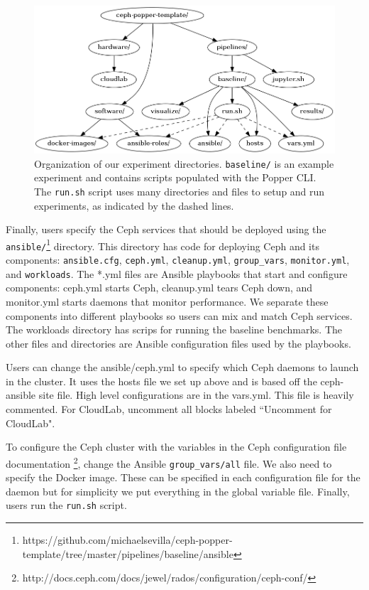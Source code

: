 \begin{figure}[tb] 
  \centering
  \includegraphics[width=1\linewidth]{./figures/expdir.png}
  \caption{Organization of our experiment directories. \texttt{baseline/} is an
example experiment and contains scripts populated with the Popper CLI. The
\texttt{run.sh} script uses many directories and files to setup and run
experiments, as indicated by the dashed lines.}
  \label{fig:expdir}
\end{figure}



Finally, users specify the Ceph services that should be deployed using the
\texttt{ansible/}\footnote{https://github.com/michaelsevilla/ceph-popper-template/tree/master/pipelines/baseline/ansible}
directory. This directory has code for deploying Ceph and its components:
\texttt{ansible.cfg}, \texttt{ceph.yml}, \texttt{cleanup.yml},
\texttt{group\_vars}, \texttt{monitor.yml}, and \texttt{workloads}. The *.yml
files are Ansible playbooks that start and configure components: ceph.yml
starts Ceph, cleanup.yml tears Ceph down, and monitor.yml starts daemons that
monitor performance. We separate these components into different playbooks so
users can mix and match Ceph services. The workloads directory has scrips for
running the baseline benchmarks. The other files and directories are Ansible
configuration files used by the playbooks.

Users can change the ansible/ceph.yml to specify which Ceph daemons to launch
in the cluster. It uses the hosts file we set up above and is based off the
ceph-ansible site file. High level configurations are in the vars.yml. This
file is heavily commented. For CloudLab, uncomment all blocks labeled
``Uncomment for CloudLab".

To configure the Ceph cluster with the variables in the Ceph configuration file
documentation
\footnote{http://docs.ceph.com/docs/jewel/rados/configuration/ceph-conf/},
change the Ansible \texttt{group\_vars/all} file. We also need to specify the
Docker image. These can be specified in each configuration file for the daemon
but for simplicity we put everything in the global variable file. Finally,
users run the \texttt{run.sh} script. 

